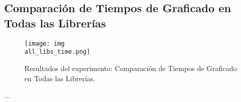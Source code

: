 \subsection{Comparación de Tiempos de Graficado en Todas las Librerías}
\label{exp:all-libs-time}

\begin{figure}[H]
    \centering
    \texttt{[image: img\\all\_libs\_time.png]}
    \caption{Resultados del experimento: Comparación de Tiempos de Graficado en Todas las Librerías.}
    \label{fig:all-libs-time}
\end{figure}

...
